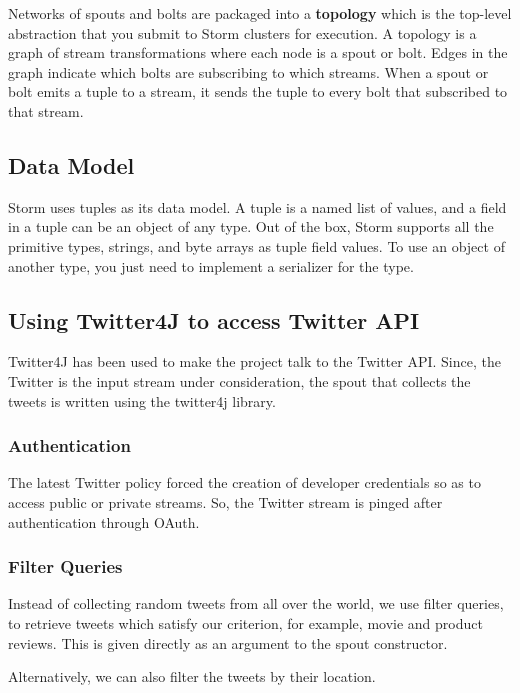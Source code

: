 \documentclass{llncs}
\begin{document}
Networks of spouts and bolts are packaged into a \textbf{topology} which is the top-level abstraction that you submit to Storm clusters for execution. A topology is a graph of stream transformations where each node is a spout or bolt. Edges in the graph indicate which bolts are subscribing to which streams. When a spout or bolt emits a tuple to a stream, it sends the tuple to every bolt that subscribed to that stream.

\subsection{Data Model}
Storm uses tuples as its data model. A tuple is a named list of values, and a field in a tuple can be an object of any type. Out of the box, Storm supports all the primitive types, strings, and byte arrays as tuple field values. To use an object of another type, you just need to implement a serializer for the type.

\subsection{Using Twitter4J to access Twitter API}
Twitter4J has been used to make the project talk to the Twitter API. Since, the Twitter is the input stream under consideration, the spout that collects the tweets is written using the twitter4j library.

\subsubsection{Authentication} 
The latest Twitter policy forced the creation of developer credentials so as to access public or private streams. So, the Twitter stream is pinged after authentication through OAuth.



\subsubsection{Filter Queries}
Instead of collecting random tweets from all over the world, we use filter queries, to retrieve tweets which satisfy our criterion, for example, movie and product reviews. This is given directly as an argument to the spout constructor.



Alternatively, we can also filter the tweets by their location.
\end{document}
